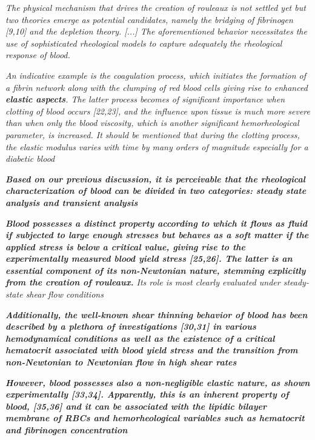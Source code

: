 \documentclass[11pt,letterpaper]{article}
\begin{document}
\textit{The physical mechanism that drives the creation of rouleaux is not settled yet but two theories emerge as potential candidates, namely the bridging of fibrinogen [9,10] and the depletion theory. [...] The aforementioned behavior necessitates the use of sophisticated rheological models to capture adequately the rheological response of blood.}


\textit{An indicative example is the coagulation process, which initiates the formation of a fibrin network along with the clumping of red blood cells giving rise to enhanced \textbf{elastic aspects}. The latter process becomes of significant importance when clotting of blood occurs [22,23], and the influence upon tissue is much more severe than when only the blood viscosity, which is another significant hemorheological parameter, is increased. It should be mentioned that during the clotting process, the elastic modulus varies with time by many orders of magnitude especially for a diabetic blood}



\textit{\textbf{Based on our previous discussion, it is perceivable that the rheological characterization of blood
can be divided in two categories: steady state analysis and transient analysis}}

{\color{blue}
\textit{\textbf{Blood possesses a distinct property according to which it flows as fluid if subjected to large enough stresses but behaves as a soft matter if the applied stress is below a critical value, giving rise to the experimentally measured blood yield stress [25,26]. The latter is an essential component of its non-Newtonian nature, stemming explicitly from the creation of rouleaux. }Its role is most clearly evaluated under steady-state shear flow conditions} }


{\color{blue}
\textit{\textbf{Additionally, the well-known shear thinning behavior of blood has been described by a plethora of investigations [30,31] in various hemodynamical conditions as well as the existence of a critical hematocrit associated with blood yield stress and the transition from non-Newtonian to Newtonian flow in high shear rates}}}



{\color{blue}
\textit{\textbf{However, blood possesses also a non-negligible elastic nature, as shown experimentally [33,34].
Apparently, this is an inherent property of blood, [35,36] and it can be associated with the lipidic bilayer membrane of RBCs and hemorheological variables such as hematocrit and fibrinogen concentration}}}
\end{document}
